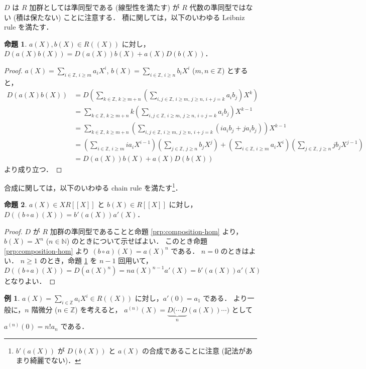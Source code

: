 \documentclass{jsarticle}
\newcommand{\N}{\mathbb{N}}
\newcommand{\Z}{\mathbb{Z}}
\theoremstyle{definition}
\newtheorem*{Exm}{例}
\newtheorem{Prp}{命題}
\newenvironment{exm}{\begin{leftbar}\begin{Exm}}{\end{Exm}\end{leftbar}}
\newenvironment{prp}{\vspace{1ex}\begin{screen}\begin{Prp}}{\end{Prp}\end{screen}}
\newenvironment{prf}{\begin{leftbar}\begin{proof}}{\end{proof}\end{leftbar}}
\begin{document}
$D$ は $R$ 加群としては準同型である (線型性を満たす) が
$R$ 代数の準同型ではない (積は保たない) ことに注意する．
積に関しては，以下のいわゆる Leibniz rule を満たす．

\begin{prp}
  \label{prp:leibniz}
  $a(X), b(X) \in R((X))$ に対し，$D(a(X) b(X)) = D(a(X)) b(X) + a(X) D(b(X))$．
\end{prp}
\begin{prf}
  $a(X) = \sum_{i\in\Z,\,i\ge m} a_i X^i$, $b(X) = \sum_{i\in\Z,\,i\ge n} b_i X^i$ ($m, n \in \Z$) とすると，
  \begin{align*}
    D(a(X) b(X))
    &= D\left(\sum_{k\in\Z,\,k\ge m+n} \left(\sum_{i,j\in\Z,\,i\ge m,\,j\ge n,\,i+j=k} a_i b_j\right) X^k\right) \\
    &= \sum_{k\in\Z,\,k\ge m+n} k \left(\sum_{i,j\in\Z,\,i\ge m,\,j\ge n,\,i+j=k} a_i b_j\right) X^{k-1} \\
    &= \sum_{k\in\Z,\,k\ge m+n} \left(\sum_{i,j\in\Z,\,i\ge m,\,j\ge n,\,i+j=k} (i a_i b_j + j a_i b_j)\right) X^{k-1} \\
    &= \left(\sum_{i\in\Z,\,i\ge m} i a_i X^{i-1}\right) \left(\sum_{j\in\Z,\,j\ge n} b_j X^j\right)
        + \left(\sum_{i\in\Z,\,i\ge m} a_i X^i\right) \left(\sum_{j\in\Z,\,j\ge n} j b_j X^{j-1}\right) \\
    &= D(a(X)) b(X) + a(X) D(b(X))
  \end{align*}
  より成り立つ．
\end{prf}

合成に関しては，以下のいわゆる chain rule を満たす\footnote{$b'(a(X))$ が $D(b(X))$ と $a(X)$ の合成であることに注意 (記法があまり綺麗でない)．}．

\begin{prp}
  $a(X) \in X R[[X]]$ と $b(X) \in R[[X]]$ に対し，
  $D((b \circ a)(X)) = b'(a(X)) a'(X)$．
\end{prp}
\begin{prf}
  $D$ が $R$ 加群の準同型であることと命題 \ref{prp:composition-hom} より，
  $b(X) = X^n$ ($n \in \N$) のときについて示せばよい．
  このとき命題 \ref{prp:composition-hom} より $(b \circ a)(X) = a(X)^n$ である．
  $n = 0$ のときはよい．
  $n \ge 1$ のとき，命題 \ref{prp:leibniz} を $n - 1$ 回用いて，
  \[
    D((b \circ a)(X))
    = D(a(X)^n)
    = n a(X)^{n-1} a'(X)
    = b'(a(X)) a'(X)
  \]
  となりよい．
\end{prf}

\begin{exm}
  $a(X) = \sum_{i\in\Z} a_i X^i \in R((X))$ に対し，$a'(0) = a_1$ である．
  より一般に，$n$ 階微分 ($n \in \Z$) を考えると，
  $a^{(n)}(X) = \underbrace{D(\cdots D}_n (a(X)) \cdots)$ として $a^{(n)}(0) = n! a_n$ である．
\end{exm}
\end{document}
